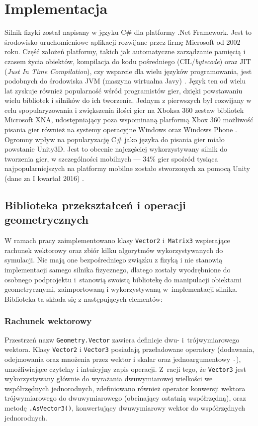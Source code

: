 \chapter{Implementacja}
\label{cha:implementacja}
Silnik fizyki został napisany w języku C\# dla platformy .Net Framework. Jest to środowisko uruchomieniowe aplikacji rozwijane przez firmę Microsoft od 2002 roku. Część założeń platformy, takich jak automatyczne zarządzanie pamięcią i czasem życia obiektów, kompilacja do kodu pośredniego (CIL/\textit{bytecode}) oraz JIT (\textit{Just In Time Compilation}), czy wsparcie dla wielu języków programowania, jest podobnych do środowiska JVM (maszyna wirtualna Javy) \cite{bib:msdndotnet}. Język ten od wielu lat zyskuje również popularność wśród programistów gier, dzięki powstawaniu wielu bibliotek i silników do ich tworzenia. Jednym z pierwszych był rozwijany w celu spopularyzowania i zwiększenia ilości gier na Xboksa 360 zestaw bibliotek Microsoft XNA, udostępniający poza wspominaną plarformą Xbox 360 możliwość pisania gier również na systemy operacyjne Windows oraz Windows Phone \cite{bib:cotojestxna}. Ogromny wpływ na popularyzację C\# jako języka do pisania gier miało powstanie Unity3D. Jest to obecnie najczęściej wykorzystywany silnik do tworzenia gier, w szczególności mobilnych --- 34\% gier spośród tysiąca najpopularniejszych na platformy mobilne zostało stworzonych za pomocą Unity (dane za I kwartał 2016) \cite{bib:popularnosc-unity}. 

\section{Biblioteka przekształceń i operacji geometrycznych}
W ramach pracy zaimplementowano klasy \verb|Vector2| i~\verb|Matrix3| wspierające rachunek wektorowy oraz zbiór kilku algorytmów wykorzystywanych do symulacji. Nie mają one bezpośredniego związku z fizyką i nie stanowią implementacji samego silnika fizycznego, dlatego zostały wyodrębnione do osobnego podprojektu i~stanowią swoistą bibliotekę do manipulacji obiektami geometrycznymi, zaimportowaną i wykorzystywaną w~implementacji silnika. Biblioteka ta składa się z następujących elementów:

\subsection{Rachunek wektorowy}
Przestrzeń nazw \verb|Geometry.Vector| zawiera definicje dwu- i~trójwymiarowego wektora. Klasy \verb|Vector2| i \verb|Vector3| posiadają przeładowane operatory (dodawania, odejmowania oraz mnożenia przez wektor i skalar oraz jednoargumentowy \verb|-|), umożliwiające czytelny i intuicyjny zapis operacji. Z~racji tego, że \verb|Vector3| jest wykorzystywany głównie do wyrażania dwuwymiarowej wielkości we współrzędnych jednorodnych, zdefiniowano również operator konwersji wektora trójwymiarowego do dwuwymiarowego (obcinający ostatnią współrzędną), oraz metodę \verb|.AsVector3()|, konwertujący dwuwymiarowy wektor do współrzędnych jednorodnych.

